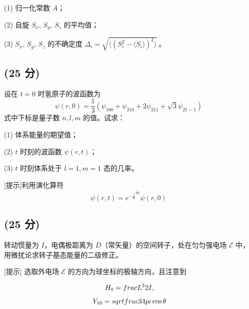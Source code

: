(1) 归一化常数 \( A \)；

(2) 自旋 \( S_x \), \( S_y \), \( S_z \) 的平均值；

(3) \( S_x \), \( S_y \), \( S_z \) 的不确定度 \(\Delta_i = \sqrt{\langle (S_i^2  - \langle S_i \rangle)^2\rangle}~\)。

\subsection{(25 分)}
设在 \( t=0 \) 时氢原子的波函数为
\[\psi(r, 0) = \frac{1}{3} \left( \psi_{100} + \psi_{210} + 2 \psi_{211} + \sqrt{3} \psi_{21-1} \right)~\]
式中下标是量子数 \( n, l, m \) 的值。试求：

(1) 体系能量的期望值；

(2) \( t \) 时刻的波函数 \( \psi(r,t) \)；

(3) \( t \) 时刻体系处于 \( l=1, m=1 \) 态的几率。

[提示]利用演化算符
\[\psi(r,t) = e^{-\frac{i }{\hbar}^{\hat{H}t}} \psi(r,0)~\]
\subsection{(25 分)}
转动惯量为 $I$，电偶极距离为 $D$（常矢量）的空间转子，处在匀匀强电场 $\mathcal{E}$ 中，用微扰论求转子基态能量的二级修正。

[提示] 选取外电场 $\mathcal{E}$ 的方向为球坐标的极轴方向，且注意到

$$H_0 = \\frac{L^2}{2I},$$

$$Y_{10} = \\sqrt{\\frac{3}{4\\pi}} \cos \theta$$
